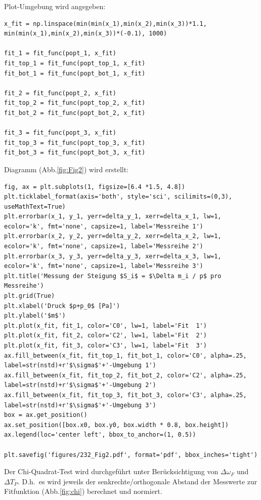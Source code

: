 \documentclass[a4paper,10pt]{article}
\begin{document}
Plot-Umgebung wird angegeben:\begin{lstlisting}
x_fit = np.linspace(min(min(x_1),min(x_2),min(x_3))*1.1, min(min(x_1),min(x_2),min(x_3))*(-0.1), 1000)

fit_1 = fit_func(popt_1, x_fit)
fit_top_1 = fit_func(popt_top_1, x_fit)
fit_bot_1 = fit_func(popt_bot_1, x_fit)

fit_2 = fit_func(popt_2, x_fit)
fit_top_2 = fit_func(popt_top_2, x_fit)
fit_bot_2 = fit_func(popt_bot_2, x_fit)

fit_3 = fit_func(popt_3, x_fit)
fit_top_3 = fit_func(popt_top_3, x_fit)
fit_bot_3 = fit_func(popt_bot_3, x_fit)

\end{lstlisting}

Diagramm (Abb.\ref{fig:Fig2}) wird erstellt:\begin{lstlisting}
fig, ax = plt.subplots(1, figsize=[6.4 *1.5, 4.8])
plt.ticklabel_format(axis='both', style='sci', scilimits=(0,3), useMathText=True)
plt.errorbar(x_1, y_1, yerr=delta_y_1, xerr=delta_x_1, lw=1, ecolor='k', fmt='none', capsize=1, label='Messreihe 1')
plt.errorbar(x_2, y_2, yerr=delta_y_2, xerr=delta_x_2, lw=1, ecolor='k', fmt='none', capsize=1, label='Messreihe 2')
plt.errorbar(x_3, y_3, yerr=delta_y_3, xerr=delta_x_3, lw=1, ecolor='k', fmt='none', capsize=1, label='Messreihe 3')
plt.title('Messung der Steigung $S_i$ = $\Delta m_i / p$ pro Messreihe')
plt.grid(True)
plt.xlabel('Druck $p+p_0$ [Pa]')
plt.ylabel('$m$')
plt.plot(x_fit, fit_1, color='C0', lw=1, label='Fit  1')
plt.plot(x_fit, fit_2, color='C2', lw=1, label='Fit  2')
plt.plot(x_fit, fit_3, color='C3', lw=1, label='Fit  3')
ax.fill_between(x_fit, fit_top_1, fit_bot_1, color='C0', alpha=.25, label=str(nstd)+r'$\sigma$'+'-Umgebung 1')
ax.fill_between(x_fit, fit_top_2, fit_bot_2, color='C2', alpha=.25, label=str(nstd)+r'$\sigma$'+'-Umgebung 2')
ax.fill_between(x_fit, fit_top_3, fit_bot_3, color='C3', alpha=.25, label=str(nstd)+r'$\sigma$'+'-Umgebung 3')
box = ax.get_position()
ax.set_position([box.x0, box.y0, box.width * 0.8, box.height])
ax.legend(loc='center left', bbox_to_anchor=(1, 0.5))

plt.savefig('figures/232_Fig2.pdf', format='pdf', bbox_inches='tight')

\end{lstlisting}

Der Chi-Quadrat-Test wird durchgeführt unter Berücksichtigung von \(\Delta \omega_F\) und \(\Delta T_P\). D.h.~es wird jeweils der senkrechte/orthogonale Abstand der Messwerte zur Fitfunktion (Abb.\ref{fig:chi}) berechnet und normiert\fnrefa.
\end{document}
